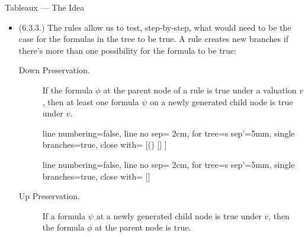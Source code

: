 \documentclass[../slides.tex]{subfiles}
\begin{document}
\begin{frame}{Tableaux --- The Idea}

	\begin{itemize}
	
		\item (6.3.3.) The rules allow us to test, step-by-step, what would need to be the case for the formulas in the tree to be true. A rule creates new branches if there's more than one possibility for the formula to be true:
		
		\begin{description}
			
				\item[Down Preservation.] If the formula $\phi$ at the parent node of a rule is true under a valuation $v$, then at least one formula $\psi$ on a newly generated child node is true under $v$.
				
				\begin{center}{\tiny
					\begin{prooftree}
					{
					line numbering=false,
					line no sep= 2cm,
					for tree={s sep'=5mm},
					single branches=true,
					close with=\xmark
					}
					[\neg (\phi\to\psi) [\phi [\neg \psi ] ] ]
					\end{prooftree}
					\begin{prooftree}
					{
					line numbering=false,
					line no sep= 2cm,
					for tree={s sep'=5mm},
					single branches=true,
					close with=\xmark
					}
					[\phi\lor\psi [\phi ] [\psi ] ]
					\end{prooftree}}
				\end{center}
				
				\item[Up Preservation.] If a formula $\psi$ at a newly generated child node is true under $v$, then the formula $\phi$ at the parent node is true.
			
			\end{description}
	
	\end{itemize}

\end{frame}
\end{document}
